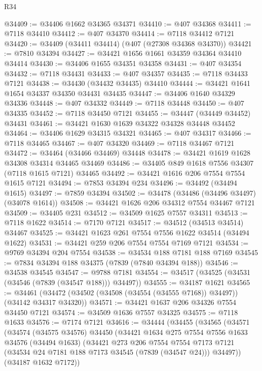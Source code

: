 \begin{lexlean}{R34}
\begin{coremodule}
@34409 := @34406 @1662 @34365 @34371
@34410 := @407 @34368
@34411 := @7118 @34410
@34412 := @407 @34370
@34414 := @7118 @34412 @7121
@34420 := @34409 (@34411 @34414) (@407 (@27308 @34368 @34370))
@34421 := @7810 @34394
@34427 := @34421 @1656 @1661 @34359 @34364 @34410 @34414
@34430 := @34406 @1655 @34351 @34358
@34431 := @407 @34354
@34432 := @7118 @34431
@34433 := @407 @34357
@34435 := @7118 @34433 @7121
@34438 := @34430 (@34432 @34435) @34410
@34444 := @34421 @1641 @1654 @34337 @34350 @34431 @34435
@34447 := @34406 @1640 @34329 @34336
@34448 := @407 @34332
@34449 := @7118 @34448
@34450 := @407 @34335
@34452 := @7118 @34450 @7121
@34455 := @34447 (@34449 @34452) @34431
@34461 := @34421 @1630 @1639 @34322 @34328 @34448 @34452
@34464 := @34406 @1629 @34315 @34321
@34465 := @407 @34317
@34466 := @7118 @34465
@34467 := @407 @34320
@34469 := @7118 @34467 @7121
@34472 := @34464 (@34466 @34469) @34448
@34478 := @34421 @1619 @1628 @34308 @34314 @34465 @34469
@34486 := @34405 @849 @1618 @7556 @34307 (@7118 @1615 @7121) @34465
@34492 := @34421 @1616 @206 @7554 @7554 @1615 @7121
@34494 := @7853 @34394 @234
@34496 := @34492 (@34494 @1615)
@34497 := @7859 @34394
@34502 := @34478 (@34486 (@34496 @34497) (@34078 @1614))
@34508 := @34421 @1626 @206 @34312 @7554 @34467 @7121
@34509 := @34405 @231
@34512 := @34509 @1625 @7557 @34311
@34513 := @7118 @1622
@34514 := @7170 @7121
@34517 := @34512 (@34513 @34514) @34467
@34525 := @34421 @1623 @261 @7554 @7556 @1622 @34514 (@34494 @1622)
@34531 := @34421 @259 @206 @7554 @7554 @7169 @7121
@34534 := @9769 @34394 @204 @7554
@34538 := @34534 @188 @7181 @188 @7169
@34545 := @7834 @34394 @188 @34375 (@7839 (@7840 @34394 @188))
@34546 := @34538 @34545
@34547 := @9788 @7181
@34554 := @34517 (@34525 (@34531 (@34546 (@7839 (@34547 @188))) @34497))
@34555 := @34187 @1621
@34565 := @34461 (@34472 (@34502 (@34508 (@34554 (@34555 @7168)) @34497)) (@34142 @34317 @34320))
@34571 := @34421 @1637 @206 @34326 @7554 @34450 @7121
@34574 := @34509 @1636 @7557 @34325
@34575 := @7118 @1633
@34576 := @7174 @7121
@34616 := @34444
    (@34455
      (@34565
        (@34571
          (@34574
            (@34575 @34576)
            @34450
            (@34421
              @1634
              @275
              @7554
              @7556
              @1633
              @34576
              (@34494 @1633)
              (@34421
                @273
                @206
                @7554
                @7554
                @7173
                @7121
                (@34534 @24 @7181 @188 @7173 @34545 (@7839 (@34547 @24)))
                @34497))
            (@34187 @1632 @7172))

\end{coremodule}
\end{lexlean}
